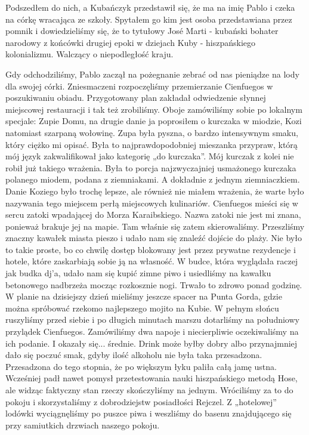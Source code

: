 Podszedłem do nich, a Kubańczyk przedstawił się, że ma na imię Pablo i czeka na córkę wracająca ze szkoły.
Spytałem go kim jest osoba przedstawiana przez pomnik i dowiedzieliśmy się, że to tytułowy José Marti - kubański bohater narodowy z końcówki drugiej epoki w dziejach Kuby - hiszpańskiego kolonializmu. Walczący o niepodległość kraju.
\par Gdy odchodziliśmy, Pablo zaczął na pożegnanie zebrać od nas pieniądze na lody dla swojej córki.
Zniesmaczeni rozpoczęliśmy przemierzanie Cienfuegos w poszukiwaniu obiadu.
Przygotowany plan zakładał odwiedzenie słynnej miejscowej restauracji i tak też zrobiliśmy.
Oboje zamówiliśmy sobie po lokalnym specjale: Zupie Domu, na drugie danie ja poprosiłem o kurczaka w miodzie, Kozi natomiast szarpaną wołowinę.
Zupa była pyszna, o bardzo intensywnym smaku, który ciężko mi opisać.
Była to najprawdopodobniej mieszanka przypraw, którą mój język zakwalifikował jako kategorię „do kurczaka”.
Mój kurczak z kolei nie robił już takiego wrażenia.
Była to porcja najzwyczajniej usmażonego kurczaka polanego miodem, podana z ziemniakami.
A dokładnie z jednym ziemniaczkiem.
Danie Koziego było trochę lepsze, ale również nie miałem wrażenia, że warte było nazywania tego miejscem perłą miejscowych kulinariów.
Cienfuegos mieści się w sercu zatoki wpadającej do Morza Karaibskiego.
Nazwa zatoki nie jest mi znana, ponieważ brakuje jej na mapie.
Tam właśnie się zatem skierowaliśmy.
Przeszliśmy znaczny kawałek miasta pieszo i udało nam się znaleźć dojście do plaży.
Nie było to takie proste, bo co chwilę dostęp blokowany jest przez prywatne rezydencje i hotele, które zaskarbiają sobie ją na własność.
W budce, która wyglądała raczej jak budka dj’a, udało nam się kupić zimne piwo i usiedliśmy na kawałku betonowego nadbrzeża mocząc rozkosznie nogi.
Trwało to zdrowo ponad godzinę.
W planie na dzisiejszy dzień mieliśmy jeszcze spacer na Punta Gorda, gdzie można spróbować rzekomo najlepszego mojito na Kubie.
W pełnym słońcu ruszyliśmy przed siebie i po długich minutach marszu dotarliśmy na południowy przylądek Cienfuegos.
Zamówiliśmy dwa napoje i niecierpliwie oczekiwaliśmy na ich podanie.
I okazały się...
średnie.
Drink może byłby dobry albo przynajmniej dało się poczuć smak, gdyby ilość alkoholu nie była taka przesadzona.
Przesadzona do tego stopnia, że po większym łyku paliła całą jamę ustna.
Wcześniej padł nawet pomysł przetestowania nauki hiszpańskiego metodą Hose, ale widząc faktyczny stan rzeczy skończyliśmy na jednym.
Wróciliśmy za to do pokoju i skorzystaliśmy z dobrodziejstw posiadłości Rejczel.
Z „hotelowej” lodówki wyciągnęliśmy po puszce piwa i weszliśmy do basenu znajdującego się przy samiutkich drzwiach naszego pokoju.